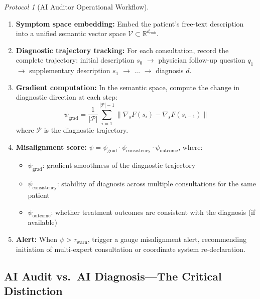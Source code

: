 \documentclass[12pt,a4paper]{article}
\theoremstyle{remark}
\newtheorem{protocol}[theorem]{Protocol}
\newcommand{\R}{\mathbb{R}}
\begin{document}
\begin{protocol}[AI Auditor Operational Workflow]\label{prot:ai_audit}
\begin{enumerate}[label=(\arabic*),itemsep=3pt]
    \item \textbf{Symptom space embedding:} Embed the patient's free-text description into a unified semantic vector space $\mathcal{V} \subset \R^{d_{\text{emb}}}$.
    \item \textbf{Diagnostic trajectory tracking:} For each consultation, record the complete trajectory: initial description $s_0$ $\to$ physician follow-up question $q_1$ $\to$ supplementary description $s_1$ $\to$ ... $\to$ diagnosis $d$.
    \item \textbf{Gradient computation:} In the semantic space, compute the change in diagnostic direction at each step:
    \begin{equation}
        \psi_{\text{grad}} = \frac{1}{|\mathcal{P}|} \sum_{i=1}^{|\mathcal{P}|-1} \|\nabla_s F(s_i) - \nabla_s F(s_{i-1})\|
    \end{equation}
    where $\mathcal{P}$ is the diagnostic trajectory.
    \item \textbf{Misalignment score:} $\psi = \psi_{\text{grad}} \cdot \psi_{\text{consistency}} \cdot \psi_{\text{outcome}}$, where:
    \begin{itemize}
        \item $\psi_{\text{grad}}$: gradient smoothness of the diagnostic trajectory
        \item $\psi_{\text{consistency}}$: stability of diagnosis across multiple consultations for the same patient
        \item $\psi_{\text{outcome}}$: whether treatment outcomes are consistent with the diagnosis (if available)
    \end{itemize}
    \item \textbf{Alert:} When $\psi > \tau_{\text{warn}}$, trigger a gauge misalignment alert, recommending initiation of multi-expert consultation or coordinate system re-declaration.
\end{enumerate}
\end{protocol}

\subsection{AI Audit vs.\ AI Diagnosis---The Critical Distinction}
\end{document}
